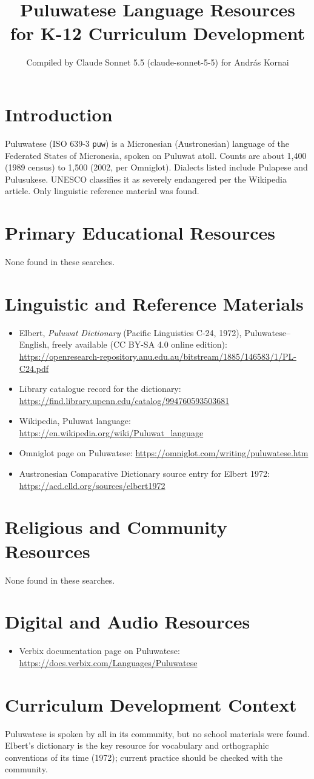 \documentclass[12pt]{article}
\title{Puluwatese Language Resources for K-12 Curriculum Development}
\author{Compiled by Claude Sonnet 5.5 (claude-sonnet-5-5) for Andr\'as Kornai}
\date{}
\begin{document}
\maketitle

\section{Introduction}
Puluwatese (ISO 639-3 \texttt{puw}) is a Micronesian (Austronesian) language of the Federated States of Micronesia, spoken on Puluwat atoll. Counts are about 1,400 (1989 census) to 1,500 (2002, per Omniglot). Dialects listed include Pulapese and Pulusukese. UNESCO classifies it as severely endangered per the Wikipedia article. Only linguistic reference material was found.

\section{Primary Educational Resources}
None found in these searches.

\section{Linguistic and Reference Materials}
\begin{itemize}
\item Elbert, \emph{Puluwat Dictionary} (Pacific Linguistics C-24, 1972), Puluwatese--English, freely available (CC BY-SA 4.0 online edition): \url{https://openresearch-repository.anu.edu.au/bitstream/1885/146583/1/PL-C24.pdf}
\item Library catalogue record for the dictionary: \url{https://find.library.upenn.edu/catalog/994760593503681}
\item Wikipedia, Puluwat language: \url{https://en.wikipedia.org/wiki/Puluwat_language}
\item Omniglot page on Puluwatese: \url{https://omniglot.com/writing/puluwatese.htm}
\item Austronesian Comparative Dictionary source entry for Elbert 1972: \url{https://acd.clld.org/sources/elbert1972}
\end{itemize}

\section{Religious and Community Resources}
None found in these searches.

\section{Digital and Audio Resources}
\begin{itemize}
\item Verbix documentation page on Puluwatese: \url{https://docs.verbix.com/Languages/Puluwatese}
\end{itemize}

\section{Curriculum Development Context}
Puluwatese is spoken by all in its community, but no school materials were found. Elbert's dictionary is the key resource for vocabulary and orthographic conventions of its time (1972); current practice should be checked with the community.
\end{document}
